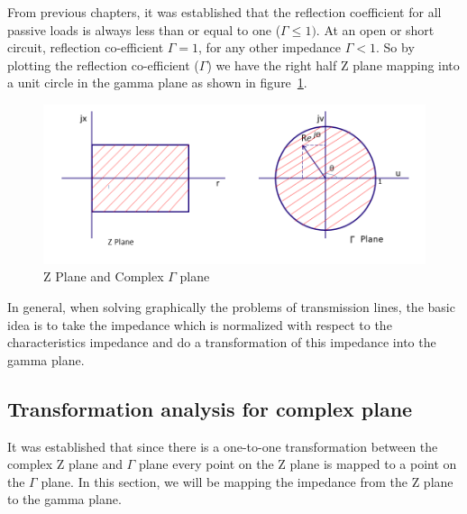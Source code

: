 From previous chapters, it was established that the reflection coefficient for all passive loads is always less than or equal to one ($\Gamma\leq 1)$. At an open or short circuit, reflection co-efficient $\Gamma = 1$, for any other impedance $\Gamma < 1$. So by plotting the reflection co-efficient ($\Gamma$) we have the right half Z plane mapping into a unit circle in the gamma plane as shown in figure~\ref{fig:oiuhgvcx}.
\begin{figure}[h]
\centering
\includegraphics[width=1.05\linewidth]{./graphics/plane_transform}
\caption{Z Plane and Complex $\Gamma$ plane}
\label{fig:oiuhgvcx}
\end{figure}

In general, when solving graphically the problems of transmission lines, the basic idea is to take the impedance which is normalized with respect to the characteristics impedance and do a transformation of this impedance into the gamma plane.

\subsection{Transformation analysis for complex plane}
It was established that since there is a one-to-one transformation between the complex Z plane and $\Gamma$ plane every point on the Z plane is mapped to a point on the $ \Gamma$ plane. In this section, we will be mapping the impedance from the Z plane to the gamma plane.

